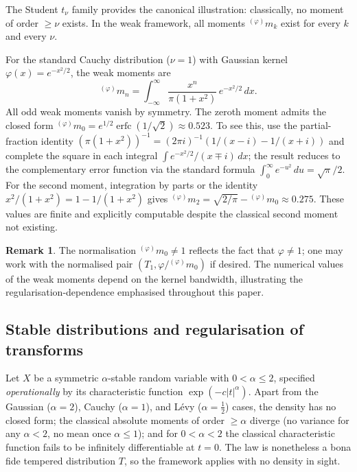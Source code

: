 \documentclass[12pt]{article}
\theoremstyle{definition}
\newtheorem{remark}[theorem]{Remark}
\begin{document}
The Student $t_\nu$ family provides the canonical illustration: classically, no moment of order $\ge\nu$ exists.  In the weak framework, all moments ${}^{(\varphi)}m_k$ exist for every $k$ and every $\nu$.

For the standard Cauchy distribution ($\nu = 1$) with Gaussian kernel $\varphi(x) = e^{-x^2/2}$, the weak moments are
\[
{}^{(\varphi)}m_n = \int_{-\infty}^{\infty} \frac{x^n}{\pi(1+x^2)}\,e^{-x^2/2}\,dx.
\]
All odd weak moments vanish by symmetry.  The zeroth moment admits the
closed form ${}^{(\varphi)}m_0 = e^{1/2}\operatorname{erfc}(1/\sqrt{2})
\approx 0.523$.  To see this, use the partial-fraction identity
$(\pi(1+x^2))^{-1} = (2\pi i)^{-1}(1/(x-i) - 1/(x+i))$ and complete
the square in each integral $\int e^{-x^2/2}/(x\mp i)\,dx$; the result
reduces to the complementary error function via the standard formula
$\int_0^\infty e^{-u^2}\,du = \sqrt{\pi}/2$.  For the second moment,
integration by parts or the identity
$x^2/(1+x^2) = 1 - 1/(1+x^2)$ gives
${}^{(\varphi)}m_2 = \sqrt{2/\pi} - {}^{(\varphi)}m_0 \approx 0.275$.
These values are finite and explicitly computable despite the classical
second moment not existing.

\begin{remark}
The normalisation ${}^{(\varphi)}m_0 \neq 1$ reflects the fact that $\varphi\neq 1$; one may work with the normalised pair $(T_1,\varphi/{}^{(\varphi)}m_0)$ if desired.  The numerical values of the weak moments depend on the kernel bandwidth, illustrating the regularisation-dependence emphasised throughout this paper.
\end{remark}

\subsection{Stable distributions and regularisation of transforms}
\label{subsec:examples_stable}

Let $X$ be a symmetric $\alpha$-stable random variable with $0<\alpha\le 2$, specified \emph{operationally} by its characteristic function $\exp(-c|t|^\alpha)$.  Apart from the Gaussian ($\alpha=2$), Cauchy ($\alpha=1$), and L\'evy ($\alpha=\tfrac12$) cases, the density has no closed form; the classical absolute moments of order $\ge\alpha$ diverge (no variance for any $\alpha<2$, no mean once $\alpha\le1$); and for $0<\alpha<2$ the classical characteristic function fails to be infinitely differentiable at $t=0$.  The law is nonetheless a bona fide tempered distribution $T$, so the framework applies with no density in sight.
\end{document}
